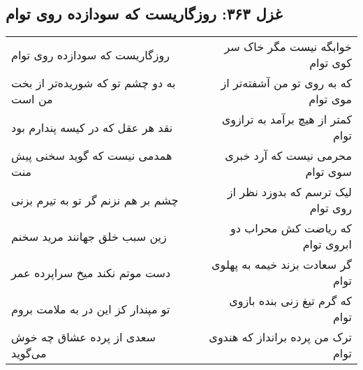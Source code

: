 \begin{center}
\section*{غزل ۳۶۳: روزگاریست که سودازده روی توام}
\label{sec:363}
\begin{longtable}{l p{0.5cm} r}
روزگاریست که سودازده روی توام
&&
خوابگه نیست مگر خاک سر کوی توام
\\
به دو چشم تو که شوریده‌تر از بخت من است
&&
که به روی تو من آشفته‌تر از موی توام
\\
نقد هر عقل که در کیسه پندارم بود
&&
کمتر از هیچ برآمد به ترازوی توام
\\
همدمی نیست که گوید سخنی پیش منت
&&
محرمی نیست که آرد خبری سوی توام
\\
چشم بر هم نزنم گر تو به تیرم بزنی
&&
لیک ترسم که بدوزد نظر از روی توام
\\
زین سبب خلق جهانند مرید سخنم
&&
که ریاضت کش محراب دو ابروی توام
\\
دست موتم نکند میخ سراپرده عمر
&&
گر سعادت بزند خیمه به پهلوی توام
\\
تو مپندار کز این در به ملامت بروم
&&
که گرم تیغ زنی بنده بازوی توام
\\
سعدی از پرده عشاق چه خوش می‌گوید
&&
ترک من پرده برانداز که هندوی توام
\\
\end{longtable}
\end{center}
